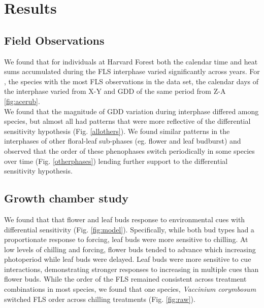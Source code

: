 \documentclass[11pt]{article}
\begin{document}
\section*{Results}
\subsection*{Field Observations}
We found that for individuals at Harvard Forest both the calendar time and heat sums accumulated during the FLS interphase varied significantly across years. For , the species with the most FLS observations in the data set, the calendar days of the interphase varied from X-Y and GDD of the same period from Z-A \ref{fig:acerub}.\\

\noindent We found that the magnitude of GDD variation during interphase differed among species, but almost all had patterns that were more reflective of the differential sensitivity hypothesis (Fig. \ref{allothers}). We found similar patterns in the interphases of other floral-leaf sub-phases (eg. flower and leaf budburst) and observed that the order of these phenophases switch periodically in some species over time (Fig. \ref{otherphases}) lending further support to the differential sensitivity hypothesis. 

\subsection*{Growth chamber study}
\noindent We found that that flower and leaf buds response to environmental cues with differential sensitivity (Fig. \ref{fig:model}). Specifically, while both bud types had a proportionate response to forcing, leaf buds were more sensitive to chilling. At low levels of chilling and forcing, flower buds tended to advance which increasing photoperiod while leaf buds were delayed. Leaf buds were more sensitive to cue interactions, demonstrating stronger responses to increasing in multiple cues than flower buds. While the order of the FLS remained consistent across treatment combinations in most species, we found that one species, \textit{Vaccinium corymbosum} switched FLS order across chilling treatments (Fig. \ref{fig:raw}). 
\end{document}
